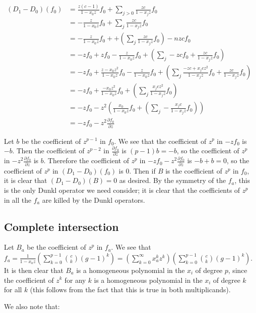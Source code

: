 \documentclass{article}
\numberwithin{equation}{section}
\begin{document}
\begin{align*}
(D_1-D_0)(f_0)&=\frac{z(c-1)}{1-x_0z}f_0+\sum_{j>0} \frac{zc}{1-x_jz}f_0\\
&=-\frac{z}{1-x_0z}f_0+\sum_{j} \frac{zc}{1-x_jz}f_0\\
&=-\frac{z}{1-x_0z}f_0++\left(\sum_{j} \frac{zc}{1-x_jz}f_0\right)-nzcf_0\\
&=-zf_0+zf_0-\frac{z}{1-x_0z}f_0+\left(\sum_{j} -zcf_0+\frac{zc}{1-x_jz}f_0\right)\\
&=-zf_0+\frac{z-x_0z^2}{1-x_0z}f_0-\frac{z}{1-x_0z}f_0+\left(\sum_{j} \frac{-zc+x_jcz^2}{1-x_jz}f_0+\frac{zc}{1-x_jz}f_0\right)\\
&=-zf_0+\frac{-x_0z^2}{1-x_0z}f_0+\left(\sum_{j} \frac{x_jcz^2}{1-x_jz}f_0\right)\\
&=-zf_0-z^2\left(\frac{x_0}{1-x_0z}f_0+\left(\sum_{j}- \frac{x_jc}{1-x_jz}f_0\right)\right)\\
&=-zf_0-z^2\frac{\partial f_0}{\partial z}
\end{align*}

Let $b$ be the coefficient of $z^{p-1}$ in $f_0$. We see that the coefficient of $z^p$ in $-zf_0$ is $-b$. Then the coefficient of $z^{p-2}$ in $\frac{\partial f_0}{\partial z}$ is $(p-1)b=-b$, so the coefficient of $z^p$ in $-z^2\frac{\partial f_0}{\partial z}$ is $b$. Therefore the coefficient of $z^p$ in $-zf_0-z^2\frac{\partial f_0}{\partial z}$ is $-b+b=0$, so the coefficient of $z^p$ in $(D_1-D_0)(f_0)$ is $0$. Then if $B$ is the coefficient of $z^p$ in $f_0$, it is clear that $(D_1-D_0)(B)=0$ as desired. By the symmetry of the $f_a$, this is the only Dunkl operator we need consider; it is clear that the coefficients of $z^p$ in all the $f_a$ are killed by the Dunkl operators.

\subsection{Complete intersection}

Let $B_a$ be the coefficient of $z^p$ in $f_a$. We see that $f_a=\frac{1}{1-x_az}\left(\sum_{k=0}^{p-1} \binom{c}{k} (g-1)^k\right)=\left(\sum_{k=0}^\infty x_a^kz^k\right)\left(\sum_{k=0}^{p-1} \binom{c}{k} (g-1)^k\right)$. It is then clear that $B_a$ is a homogeneous polynomial in the $x_i$ of degree $p$, since the coefficient of $z^k$ for any $k$ is a homogeneous polynomial in the $x_i$ of degree $k$ for all $k$ (this follows from the fact that this is true in both multiplicands). 

We also note that:
\end{document}

